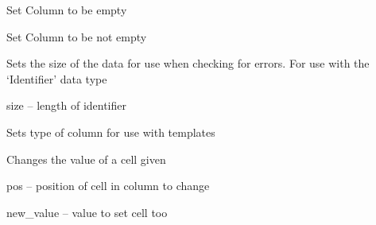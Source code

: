 \documentclass[letterpaper,10pt,english]{sphinxmanual}
\begin{document}
\begin{fulllineitems}
\begin{fulllineitems}
\end{fulllineitems}


\begin{fulllineitems}
\label{Code_rst/dat:data.Column.set_empty}
Set Column to be empty

\end{fulllineitems}


\begin{fulllineitems}
\label{Code_rst/dat:data.Column.set_not_empty}
Set Column to be not empty

\end{fulllineitems}


\begin{fulllineitems}
\label{Code_rst/dat:data.Column.set_size}
Sets the size of the data for use when checking for errors.
For use with the `Identifier' data type

size -- length of identifier

\end{fulllineitems}


\begin{fulllineitems}
\label{Code_rst/dat:data.Column.set_type}
Sets type of column for use with templates

\end{fulllineitems}


\begin{fulllineitems}
\label{Code_rst/dat:data.Column.updateCell}
Changes the value of a cell given

pos -- position of cell in column to change

new\_value -- value to set cell too

\end{fulllineitems}


\end{fulllineitems}
\end{document}
